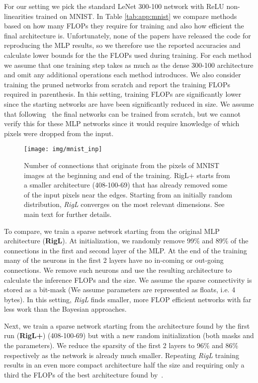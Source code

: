 \documentclass{article}
\begin{document}
For our setting we pick the standard LeNet 300-100 network with ReLU non-linearities trained on MNIST. In Table \ref{tab:app:mnist} we compare methods based on how many FLOPs they require for training and also how efficient the final architecture is. Unfortunately, none of the papers have released the code for reproducing the MLP results, so we therefore use the reported accuracies and calculate lower bounds for the the FLOPs used during training. For each method we assume that one training step takes as much as the dense 300-100 architecture and omit any additional operations each method introduces. We also consider training the pruned networks from scratch and report the training FLOPs required in parenthesis. In this setting, training FLOPs are significantly lower since the starting networks are have been significantly reduced in size.  We assume that following~\citep{Liu2018} the final networks can be trained from scratch, but we cannot verify this for these MLP networks since it would require knowledge of which pixels were dropped from the input.
\begin{figure*}
\centering
  \texttt{[image: img/mnist\_inp]}
\caption{Number of connections that originate from the pixels of MNIST images at the beginning and end of the training. RigL+ starts from a smaller architecture (408-100-69) that has already removed some of the input pixels near the edges. Starting from an initially random distribution, \textit{RigL} converges on the most relevant dimensions. See main text for further details.}
\label{fig:app:mnist}
\end{figure*}

To compare, we train a sparse network starting from the original MLP architecture (\textbf{RigL}). At initialization, we randomly remove 99\% and 89\% of the connections in the first and second layer of the MLP.  At the end of the training many of the neurons in the first 2 layers have no in-coming or out-going connections. We remove such neurons and use the resulting architecture to calculate the inference FLOPs and the size. We assume the sparse connectivity is stored as a bit-mask (We assume parameters are represented as floats, i.e. 4 bytes). In this setting, \textit{RigL} finds smaller, more FLOP efficient networks with far less work than the Bayesian approaches.

Next, we train a sparse network starting from the architecture found by the first run (\textbf{RigL+}) (408-100-69) but with a new random initialization (both masks and the parameters).
We reduce the sparsity of the first 2 layers to 96\% and 86\% respectively as the network is already much smaller. Repeating \textit{RigL} training results in an even more compact architecture half the size and requiring only a third the FLOPs of the best architecture found by~\citet{vib2018}.
\end{document}
